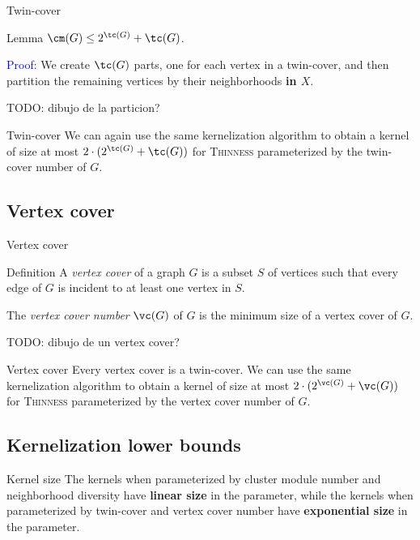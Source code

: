 \documentclass{beamer}
\begin{document}
\begin{frame}{Twin-cover}
    \begin{block}{Lemma}
        $\cm(G) \leq 2^{\tc(G)} + \tc(G)$.
    \end{block}

    \textcolor{blue}{Proof:} We create $\tc(G)$ parts, one for each vertex in a twin-cover, and then partition the remaining vertices by their neighborhoods \textbf{in $X$}.

    TODO: dibujo de la particion?
\end{frame}


\begin{frame}{Twin-cover}
    We can again use the same kernelization algorithm to obtain a kernel of size at most $2 \cdot (2^{\tc(G)} + \tc(G))$ for \textsc{Thinness} parameterized by the twin-cover number of $G$.
\end{frame}

\subsection{Vertex cover}
\begin{frame}{Vertex cover}
    \begin{block}{Definition}
        A \emph{vertex cover} of a graph $G$ is a subset $S$ of vertices such that every edge of $G$ is incident to at least one vertex in $S$.

        The \emph{vertex cover number} $\vc(G)$ of $G$ is the minimum size of a vertex cover of $G$.
    \end{block}
    TODO: dibujo de un vertex cover?
\end{frame}

\begin{frame}{Vertex cover}
    Every vertex cover is a twin-cover.
    We can use the same kernelization algorithm to obtain a kernel of size at most $2 \cdot (2^{\vc(G)} + \vc(G))$ for \textsc{Thinness} parameterized by the vertex cover number of $G$.
\end{frame}

\subsection{Kernelization lower bounds}
\begin{frame}{Kernel size}
    The kernels when parameterized by cluster module number and neighborhood diversity have \textbf{linear size} in the parameter, while the kernels when parameterized by twin-cover and vertex cover number have \textbf{exponential size} in the parameter.


\end{frame}
\end{document}
